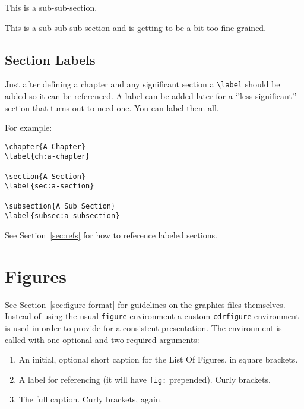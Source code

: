 This is a sub-sub-section.


This is a sub-sub-sub-section and is getting to be a bit too fine-grained.

\subsection{Section Labels}

Just after defining a chapter and any significant section a
\verb|\label| should be added so it can be referenced.
A label can be added later for a `'less significant'' section that
turns out to need one. You can label them all. 

For example:

\begin{verbatim}
\chapter{A Chapter}
\label{ch:a-chapter}

\section{A Section}
\label{sec:a-section}

\subsection{A Sub Section}
\label{subsec:a-subsection}
\end{verbatim}

See Section~\ref{sec:refs} for how to reference labeled sections.

\FloatBarrier
\section{Figures}
\label{sec:figures}

See Section~\ref{sec:figure-format} for guidelines on the graphics files themselves.
Instead of using the usual \texttt{figure} environment a custom \texttt{cdrfigure}
environment is used in order to provide for a consistent presentation.
The environment is called with one optional and two required
arguments:

\begin{enumerate}
\item An initial, optional short caption for the List Of Figures, in square brackets.
\item A label for referencing (it will have \texttt{fig:} prepended). Curly brackets.
\item The full caption. Curly brackets, again.
\end{enumerate}

